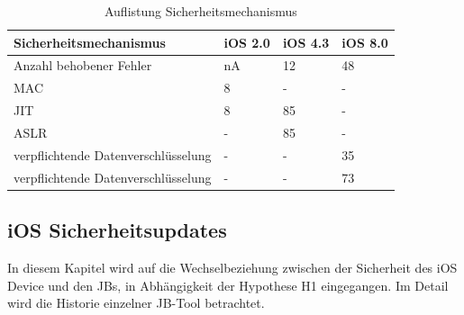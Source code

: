 \begin{table}[htp!]
    \begin{center}
        \begin{tabular}{|l|l|l|l|} \hline
            \textbf{Sicherheitsmechanismus} & \textbf{iOS 2.0} & \textbf{iOS 4.3} & \textbf{iOS 8.0} \\ \hline
             Anzahl behobener Fehler & nA & 12 & 48\\ \hline
             MAC & 8 & - & - \\ \hline
             JIT & 8 & 85 & - \\ \hline
             ASLR & - & 85 & - \\ \hline
             verpflichtende Datenverschlüsselung & - & - & 35 \\ \hline
             verpflichtende Datenverschlüsselung & - & - & 73\\ \hline
        \end{tabular} 
        \caption{Auflistung Sicherheitsmechanismus}
        \label{tab:SecMechanismBugs}
    \end{center}
\end{table}

\newpage
\subsection{iOS Sicherheitsupdates}
\label{sec:Frage2SecUpdate}

In diesem Kapitel wird auf die Wechselbeziehung zwischen der Sicherheit des iOS Device und den JBs, in Abhängigkeit der Hypothese H1 eingegangen. Im Detail wird die Historie einzelner JB-Tool betrachtet. 

